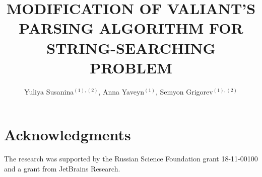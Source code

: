 \documentclass[12pt,a4paper]{cibb}
\title{\large $\ $\\ \bf MODIFICATION OF VALIANT'S PARSING ALGORITHM FOR STRING-SEARCHING PROBLEM}
\author{Yuliya Susanina$^{(1),(2)}$, Anna Yaveyn$^{(1)}$, Semyon Grigorev$^{(1),(2)}$}
\begin{document}
\thispagestyle{myheadings}
\pagestyle{myheadings}







\section*{\bf Acknowledgments}

The research was supported by the Russian Science Foundation grant 18-11-00100 and a grant from JetBrains Research.


%


{\fontsize{10}{10}\selectfont
\setlength{\parskip}{0pt}



}
\end{document}
